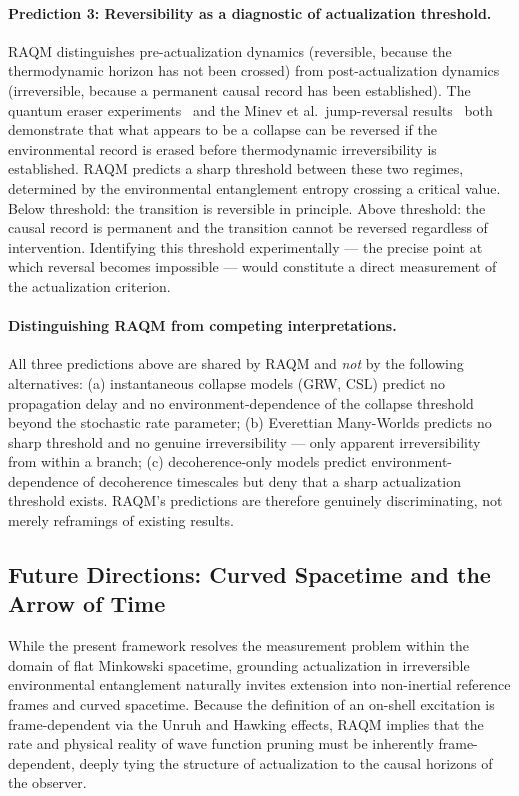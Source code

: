 \documentclass[11pt,a4paper]{article}
\theoremstyle{plain}
\theoremstyle{definition}
\theoremstyle{remark}
\begin{document}
\paragraph{Prediction 3: Reversibility as a diagnostic of actualization threshold.}
RAQM distinguishes pre-actualization dynamics (reversible, because the
thermodynamic horizon has not been crossed) from post-actualization dynamics
(irreversible, because a permanent causal record has been established). The quantum
eraser experiments~\citep{ScullyDruhl1982} and the Minev et al.\ jump-reversal
results~\citep{Minev2019} both demonstrate that what appears to be a collapse can
be reversed if the environmental record is erased before thermodynamic
irreversibility is established. RAQM predicts a sharp threshold between these two
regimes, determined by the environmental entanglement entropy crossing a critical
value. Below threshold: the transition is reversible in principle. Above threshold:
the causal record is permanent and the transition cannot be reversed regardless of
intervention. Identifying this threshold experimentally --- the precise point at
which reversal becomes impossible --- would constitute a direct measurement of the
actualization criterion.

\paragraph{Distinguishing RAQM from competing interpretations.}
All three predictions above are shared by RAQM and \emph{not} by the following
alternatives: (a) instantaneous collapse models (GRW, CSL) predict no propagation
delay and no environment-dependence of the collapse threshold beyond the stochastic
rate parameter; (b) Everettian Many-Worlds predicts no sharp threshold and no
genuine irreversibility --- only apparent irreversibility from within a branch; (c)
decoherence-only models predict environment-dependence of decoherence timescales
but deny that a sharp actualization threshold exists. RAQM's predictions are
therefore genuinely discriminating, not merely reframings of existing results.

\subsection{Future Directions: Curved Spacetime and the Arrow of Time}
\label{sec:future}

While the present framework resolves the measurement problem within the domain of
flat Minkowski spacetime, grounding actualization in irreversible environmental
entanglement naturally invites extension into non-inertial reference frames and
curved spacetime. Because the definition of an on-shell excitation is
frame-dependent via the Unruh and Hawking effects, RAQM implies that the rate and
physical reality of wave function pruning must be inherently frame-dependent,
deeply tying the structure of actualization to the causal horizons of the observer.
\end{document}
